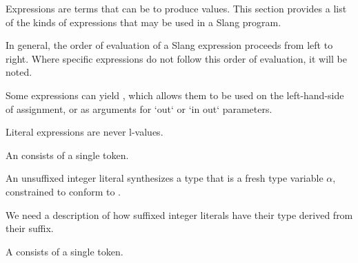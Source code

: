 
Expressions are terms that can be  to produce values.
This section provides a list of the kinds of expressions that may be used in a Slang program.

In general, the order of evaluation of a Slang expression proceeds from left to right.
Where specific expressions do not follow this order of evaluation, it will be noted.

Some expressions can yield , which allows them to be used on the left-hand-side of assignment, or as arguments for `out` or `in out` parameters.


Literal expressions are never l-values.


An  consists of a single  token.

\begin{Checking}
\end{Checking}

\begin{Description}
An unsuffixed integer literal synthesizes a type that is a fresh type variable $\alpha$, constrained to conform to .
\end{Description}

\begin{Incomplete}
We need a description of how suffixed integer literals have their type derived from their suffix.
\end{Incomplete}


A  consists of a single  token.

\begin{Checking}
\end{Checking}

